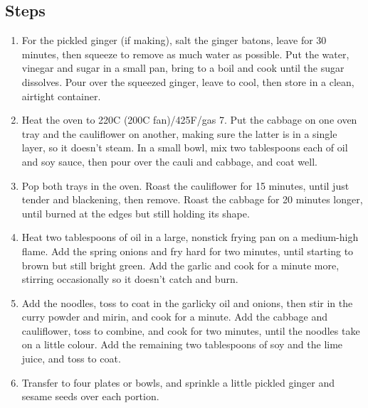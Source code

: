 \documentclass{book}
\begin{document}
\subsection*{Steps}
\begin{enumerate}
\item For the pickled ginger (if making), salt the ginger batons, leave for 30 minutes, then squeeze to remove as much water as possible. Put the water, vinegar and sugar in a small pan, bring to a boil and cook until the sugar dissolves. Pour over the squeezed ginger, leave to cool, then store in a clean, airtight container.
\item Heat the oven to 220C (200C fan)/425F/gas 7. Put the cabbage on one oven tray and the cauliflower on another, making sure the latter is in a single layer, so it doesn’t steam. In a small bowl, mix two tablespoons each of oil and soy sauce, then pour over the cauli and cabbage, and coat well.
\item Pop both trays in the oven. Roast the cauliflower for 15 minutes, until just tender and blackening, then remove. Roast the cabbage for 20 minutes longer, until burned at the edges but still holding its shape.
\item Heat two tablespoons of oil in a large, nonstick frying pan on a medium-high flame. Add the spring onions and fry hard for two minutes, until starting to brown but still bright green. Add the garlic and cook for a minute more, stirring occasionally so it doesn’t catch and burn.
\item Add the noodles, toss to coat in the garlicky oil and onions, then stir in the curry powder and mirin, and cook for a minute. Add the cabbage and cauliflower, toss to combine, and cook for two minutes, until the noodles take on a little colour. Add the remaining two tablespoons of soy and the lime juice, and toss to coat.
\item Transfer to four plates or bowls, and sprinkle a little pickled ginger and sesame seeds over each portion. 
\end{enumerate}
\newpage
\end{document}
